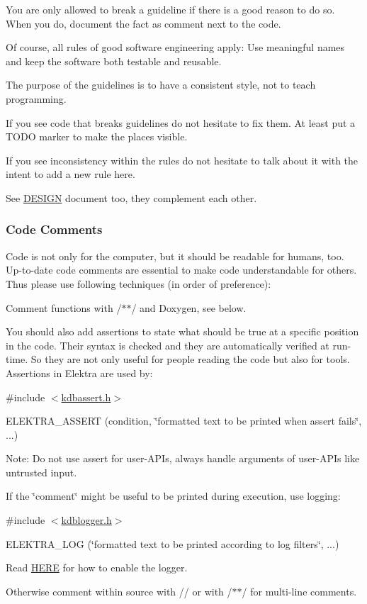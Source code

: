 You are only allowed to break a guideline if there is a good reason to do so. When you do, document the fact as comment next to the code.

Of course, all rules of good software engineering apply\+: Use meaningful names and keep the software both testable and reusable.

The purpose of the guidelines is to have a consistent style, not to teach programming.

If you see code that breaks guidelines do not hesitate to fix them. At least put a T\+O\+DO marker to make the places visible.

If you see inconsistency within the rules do not hesitate to talk about it with the intent to add a new rule here.

See \hyperlink{doc_DESIGN_md}{D\+E\+S\+I\+GN} document too, they complement each other.

\subsubsection*{Code Comments}

Code is not only for the computer, but it should be readable for humans, too. Up-\/to-\/date code comments are essential to make code understandable for others. Thus please use following techniques (in order of preference)\+:


\begin{DoxyEnumerate}
\item Comment functions with {\ttfamily /$\ast$$\ast$/} and Doxygen, see below.
\item You should also add assertions to state what should be true at a specific position in the code. Their syntax is checked and they are automatically verified at run-\/time. So they are not only useful for people reading the code but also for tools. Assertions in Elektra are used by\+:

{\ttfamily \#include $<$\hyperlink{kdbassert_8h}{kdbassert.\+h}$>$}

{\ttfamily E\+L\+E\+K\+T\+R\+A\+\_\+\+A\+S\+S\+E\+RT (condition, \char`\"{}formatted text to be printed when assert fails\char`\"{}, ...)}

Note\+: Do not use assert for user-\/\+A\+P\+Is, always handle arguments of user-\/\+A\+P\+Is like untrusted input.
\item If the \char`\"{}comment\char`\"{} might be useful to be printed during execution, use logging\+:

{\ttfamily \#include $<$\hyperlink{kdblogger_8h}{kdblogger.\+h}$>$}

{\ttfamily E\+L\+E\+K\+T\+R\+A\+\_\+\+L\+OG (\char`\"{}formatted text to be printed according to log filters\char`\"{}, ...)}

Read \hyperlink{doc_dev_logging_md}{H\+E\+RE} for how to enable the logger.
\item Otherwise comment within source with {\ttfamily //} or with {\ttfamily /$\ast$$\ast$/} for multi-\/line comments.
\end{DoxyEnumerate}

